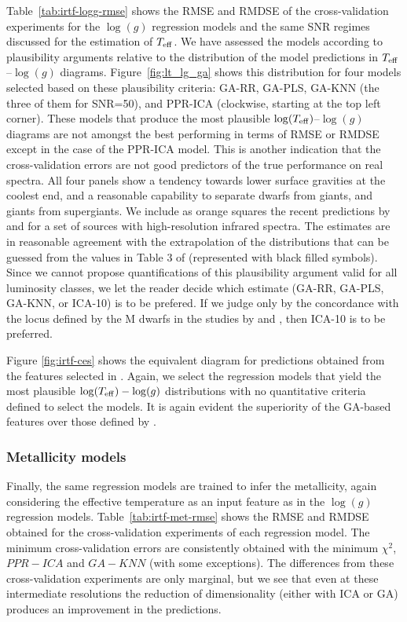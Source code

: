 Table~\ref{tab:irtf-logg-rmse} shows the RMSE and RMDSE of the
cross-validation experiments for the $\log(g)$ regression models and
the same SNR regimes discussed for the estimation of $T_{\rm eff}$. We
have assessed the models according to plausibility arguments relative
to the distribution of the model predictions in $T_{\rm
eff}$--$\log(g)$ diagrams.  Figure~\ref{fig:lt_lg_ga} shows this
distribution for four models selected based on these plausibility
criteria: GA-RR, GA-PLS, GA-KNN (the three of them for SNR=50), and
PPR-ICA (clockwise, starting at the top left corner). These
models that produce the most plausible $\log(T_{\rm eff})$--$\log(g)$
diagrams are not amongst the best performing in terms of RMSE or RMDSE
except in the case of the PPR-ICA model. This is another indication
that the cross-validation errors are not good predictors of the true
performance on real spectra. All four panels show a tendency towards
lower surface gravities at the coolest end, and a reasonable
capability to separate dwarfs from giants, and giants from
supergiants. We include as orange squares the recent predictions
by \cite{esm1} and \cite{esm2} for a set of sources with
high-resolution infrared spectra. The estimates are in reasonable
agreement with the extrapolation of the distributions that can be
guessed from the values in Table 3 of \cite{cesetti} (represented with
black filled symbols). Since we cannot propose quantifications of this
plausibility argument valid for all luminosity classes, we let the
reader decide which estimate (GA-RR, GA-PLS, GA-KNN, or ICA-10) is to
be prefered. If we judge only by the concordance with the locus
defined by the M dwarfs in the studies by \cite{esm1} and \cite{esm2},
then ICA-10 is to be preferred.

Figure \ref{fig:irtf-ces} shows the equivalent diagram for predictions
obtained from the features selected in \cite{cesetti}. Again, we
select the regression models that yield the most plausible
$\log(T_{\rm eff})-\log(g)$ distributions with no quantitative
criteria defined to select the models. It is again evident the
superiority of the GA-based features over those defined
by \cite{cesetti}.

\subsubsection{Metallicity models} 
\label{sect:irtf-met}

Finally, the same regression models are trained to infer the
metallicity, again considering the effective temperature as an input
feature as in the $\log(g)$ regression
models. Table~\ref{tab:irtf-met-rmse} shows the RMSE and RMDSE
obtained for the cross-validation experiments of each regression
model. The minimum cross-validation errors are consistently obtained
with the minimum $\chi^2$, $PPR-ICA$ and $GA-KNN$ (with some
exceptions). The differences from these cross-validation experiments
are only marginal, but we see that even at these intermediate
resolutions the reduction of dimensionality (either with ICA or GA)
produces an improvement in the predictions.

